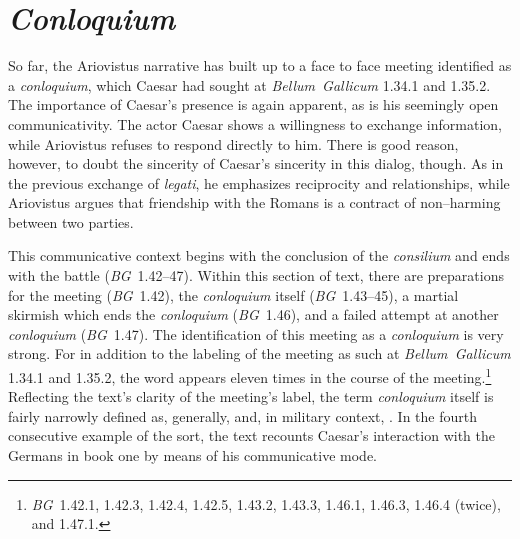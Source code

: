 \documentclass[12pt,letterpaper,oneside,final]{memoir}
\begin{document}
\section{\emph{Conloquium}}
\label{bg-conloquium}
So far, the Ariovistus narrative has built up to a face to face meeting identified as a \emph{conloquium}, which Caesar had sought at \emph{Bellum~Gallicum} 1.34.1 and 1.35.2. The importance of Caesar's presence is again apparent, as is his seemingly open communicativity. The actor Caesar shows a willingness to exchange information, while Ariovistus refuses to respond directly to him. There is good reason, however, to doubt the sincerity of Caesar's sincerity in this dialog, though. As in the previous exchange of \emph{legati}, he emphasizes reciprocity and relationships, while Ariovistus argues that friendship with the Romans is a contract of non--harming between two parties. 

This communicative context begins with the conclusion of the \emph{consilium} and ends with the battle (\emph{BG}~1.42--47). Within this section of text, there are preparations for the meeting (\emph{BG}~1.42), the \emph{conloquium} itself (\emph{BG}~1.43--45), a martial skirmish which ends the \emph{conloquium} (\emph{BG}~1.46), and a failed attempt at another \emph{conloquium} (\emph{BG}~1.47). The identification of this meeting as a \emph{conloquium} is very strong. For in addition to the labeling of the meeting as such at \emph{Bellum~Gallicum} 1.34.1 and 1.35.2, the word appears eleven times in the course of the meeting.\footnote{\emph{BG}~1.42.1, 1.42.3, 1.42.4, 1.42.5, 1.43.2, 1.43.3, 1.46.1, 1.46.3, 1.46.4 (twice), and 1.47.1.} Reflecting the text's clarity of the meeting's label, the term \emph{conloquium} itself is fairly narrowly defined as, generally,  and, in military context, . In the fourth consecutive example of the sort, the text recounts Caesar's interaction with the Germans in book one by means of his communicative mode.
\end{document}
